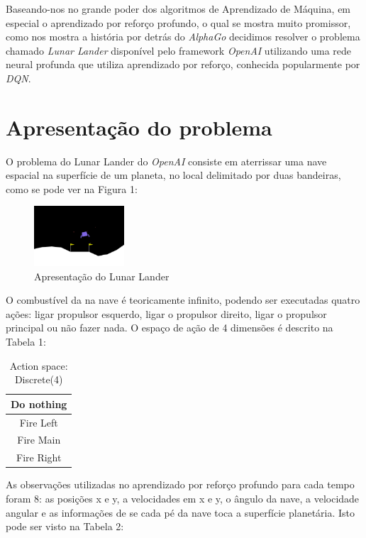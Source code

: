 \documentclass[letterpaper, 10 pt, conference]{ieeeconf}  %
\begin{document}
Baseando-nos no grande poder dos algoritmos de Aprendizado de Máquina, em especial o aprendizado por reforço profundo, o qual se mostra muito promissor, como nos mostra a história por detrás do \emph{AlphaGo} decidimos  resolver o problema chamado  \emph{Lunar Lander} disponível pelo framework \emph{OpenAI} utilizando uma rede neural profunda que utiliza aprendizado por reforço, conhecida popularmente por \emph{DQN}.


\section{Apresentação do problema}

O problema do Lunar Lander do \emph{OpenAI} consiste em aterrissar uma nave espacial na superfície de um planeta, no local delimitado por duas bandeiras, como se pode ver na Figura 1:

\begin{figure}[H]
\centering
\includegraphics[width=0.3\textwidth]{a.png}
\caption{Apresentação do Lunar Lander}
\label{fig:comparacao}
\end{figure}

O combustível da na nave é teoricamente infinito, podendo ser executadas quatro ações: ligar propulsor esquerdo, ligar o propulsor direito, ligar o propulsor principal ou não fazer nada. O espaço de ação de 4 dimensões é descrito na Tabela 1:

\begin{table}[h]
\caption{Action space: Discrete(4)}
\label{table_example}
\begin{center}
\begin{tabular}{|c|}
\hline
 Do nothing\\
\hline
Fire Left\\
\hline
Fire Main\\
\hline
Fire Right\\
\hline
\end{tabular}
\end{center}
\end{table}

As observações utilizadas no aprendizado por reforço profundo para cada tempo foram 8: as posições x e y, a velocidades em x e y, o ângulo da nave, a velocidade angular e as informações de se cada pé da nave toca a superfície planetária. Isto pode ser visto na Tabela 2:
\end{document}
